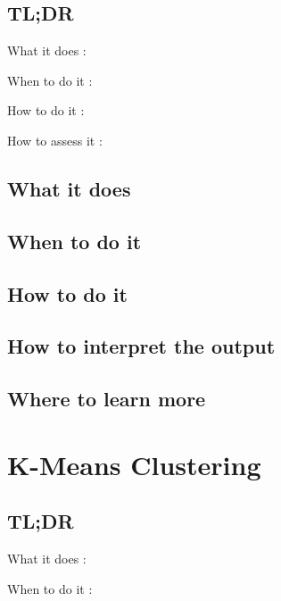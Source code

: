 \documentclass[
]{book}
\begin{document}
\hypertarget{tldr-21}{%
\section{TL;DR}\label{tldr-21}}

What it does
:

When to do it
:

How to do it
:

How to assess it
:

\hypertarget{what-it-does-21}{%
\section{What it does}\label{what-it-does-21}}

\hypertarget{when-to-do-it-21}{%
\section{When to do it}\label{when-to-do-it-21}}

\hypertarget{how-to-do-it-21}{%
\section{How to do it}\label{how-to-do-it-21}}

\hypertarget{how-to-interpret-the-output-21}{%
\section{How to interpret the output}\label{how-to-interpret-the-output-21}}

\hypertarget{where-to-learn-more-21}{%
\section{Where to learn more}\label{where-to-learn-more-21}}

\hypertarget{k-means-clustering}{%
\chapter{K-Means Clustering}\label{k-means-clustering}}

\hypertarget{tldr-22}{%
\section{TL;DR}\label{tldr-22}}

What it does
:

When to do it
:
\end{document}
